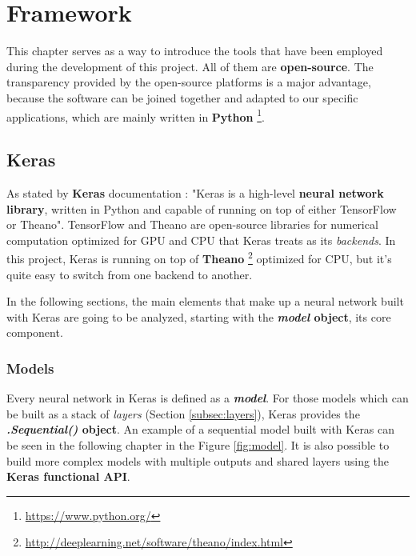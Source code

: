 \chapter{Framework}\label{ch:framework}
This chapter serves as a way to introduce the tools that have been employed during the development of this project. All of them are \textbf{open-source}. The transparency provided by the open-source platforms is a major advantage, because the software can be joined together and adapted to our specific applications, which are mainly written in \textbf{Python} \footnote{\url{https://www.python.org/}}.

\section{Keras}\label{sec:keras}
As stated by \textbf{Keras} documentation \cite{chollet2015keras}: "Keras is a high-level \textbf{neural network library}, written in Python and capable of running on top of either TensorFlow or Theano". TensorFlow and Theano are open-source libraries for numerical computation optimized for GPU and CPU that Keras treats as its \textit{backends}. In this project, Keras is running on top of \textbf{Theano} \footnote{\url{http://deeplearning.net/software/theano/index.html}} optimized for CPU, but it's quite easy to switch from one backend to another.

In the following sections, the main elements that make up a neural network built with Keras are going to be analyzed, starting with the \textbf{\textit{model} object}, its core component.

\subsection{Models}\label{subsec:models}
Every neural network in Keras is defined as a \textbf{\textit{model}}. For those models which can be built as a stack of \textit{layers} (Section \ref{subsec:layers}), Keras provides the \textbf{\textit{.Sequential()} object}. An example of a sequential model built with Keras can be seen in the following chapter in the Figure \ref{fig:model}. It is also possible to build more complex models with multiple outputs and shared layers using the \textbf{Keras functional API}.

